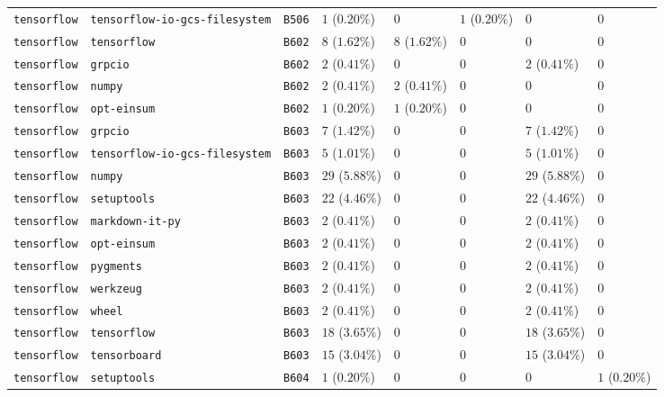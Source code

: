 \begin{table}
\begin{tabular}{llllllll}
\texttt{tensorflow} & \texttt{tensorflow-io-gcs-filesystem} & \texttt{B506} & $1$ ($0.20\%$) & $0$ & $1$ ($0.20\%$) & $0$ & $0$ \\
\texttt{tensorflow} & \texttt{tensorflow} & \texttt{B602} & $8$ ($1.62\%$) & $8$ ($1.62\%$) & $0$ & $0$ & $0$ \\
\texttt{tensorflow} & \texttt{grpcio} & \texttt{B602} & $2$ ($0.41\%$) & $0$ & $0$ & $2$ ($0.41\%$) & $0$ \\
\texttt{tensorflow} & \texttt{numpy} & \texttt{B602} & $2$ ($0.41\%$) & $2$ ($0.41\%$) & $0$ & $0$ & $0$ \\
\texttt{tensorflow} & \texttt{opt-einsum} & \texttt{B602} & $1$ ($0.20\%$) & $1$ ($0.20\%$) & $0$ & $0$ & $0$ \\
\texttt{tensorflow} & \texttt{grpcio} & \texttt{B603} & $7$ ($1.42\%$) & $0$ & $0$ & $7$ ($1.42\%$) & $0$ \\
\texttt{tensorflow} & \texttt{tensorflow-io-gcs-filesystem} & \texttt{B603} & $5$ ($1.01\%$) & $0$ & $0$ & $5$ ($1.01\%$) & $0$ \\
\texttt{tensorflow} & \texttt{numpy} & \texttt{B603} & $29$ ($5.88\%$) & $0$ & $0$ & $29$ ($5.88\%$) & $0$ \\
\texttt{tensorflow} & \texttt{setuptools} & \texttt{B603} & $22$ ($4.46\%$) & $0$ & $0$ & $22$ ($4.46\%$) & $0$ \\
\texttt{tensorflow} & \texttt{markdown-it-py} & \texttt{B603} & $2$ ($0.41\%$) & $0$ & $0$ & $2$ ($0.41\%$) & $0$ \\
\texttt{tensorflow} & \texttt{opt-einsum} & \texttt{B603} & $2$ ($0.41\%$) & $0$ & $0$ & $2$ ($0.41\%$) & $0$ \\
\texttt{tensorflow} & \texttt{pygments} & \texttt{B603} & $2$ ($0.41\%$) & $0$ & $0$ & $2$ ($0.41\%$) & $0$ \\
\texttt{tensorflow} & \texttt{werkzeug} & \texttt{B603} & $2$ ($0.41\%$) & $0$ & $0$ & $2$ ($0.41\%$) & $0$ \\
\texttt{tensorflow} & \texttt{wheel} & \texttt{B603} & $2$ ($0.41\%$) & $0$ & $0$ & $2$ ($0.41\%$) & $0$ \\
\texttt{tensorflow} & \texttt{tensorflow} & \texttt{B603} & $18$ ($3.65\%$) & $0$ & $0$ & $18$ ($3.65\%$) & $0$ \\
\texttt{tensorflow} & \texttt{tensorboard} & \texttt{B603} & $15$ ($3.04\%$) & $0$ & $0$ & $15$ ($3.04\%$) & $0$ \\
\texttt{tensorflow} & \texttt{setuptools} & \texttt{B604} & $1$ ($0.20\%$) & $0$ & $0$ & $0$ & $1$ ($0.20\%$) \\

\end{tabular}
\end{table}
